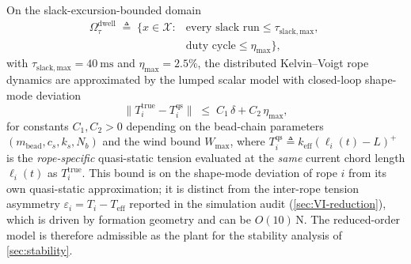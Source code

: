 \begin{theorem}
\label{thm:reduction}
On the slack-excursion-bounded domain
\begin{align}
\label{eq:omega-dwell}
  \Omega_\tau^{\mathrm{dwell}} \;\triangleq\;
    \bigl\{ x \in \mathcal{X} :
      &\text{every slack run} \le \tau_{\mathrm{slack,max}},\;\\
      &\text{duty cycle} \le \eta_{\max} \bigr\},\nonumber
\end{align}
with $\tau_{\mathrm{slack,max}} = \SI{40}{\milli\second}$ and $\eta_{\max} = 2.5\%$, the distributed Kelvin--Voigt rope dynamics are approximated by the lumped scalar model with closed-loop shape-mode deviation
\begin{equation}
  \|T_i^{\mathrm{true}} - T_i^{\mathrm{qs}}\|
    \;\le\; C_1\,\delta + C_2\,\eta_{\max},
  \label{eq:reduction-error}
\end{equation}
for constants $C_1, C_2 > 0$ depending on the bead-chain parameters $(m_{\mathrm{bead}}, c_s, k_s, N_b)$ and the wind bound $W_{\max}$, where $T_i^{\mathrm{qs}} \triangleq k_{\mathrm{eff}}(\ell_i(t) - L)^+$ is the\emph{ rope-specific} quasi-static tension evaluated at the \emph{same} current chord length $\ell_i(t)$ as $T_i^{\mathrm{true}}$.  This bound is on the shape-mode deviation of rope $i$ from its own quasi-static approximation; it is distinct from the inter-rope tension asymmetry $\varepsilon_i = T_i - T_{\mathrm{eff}}$ reported in the simulation audit (\cref{sec:VI-reduction}), which is driven by formation geometry and can be $O(10)$\,N. The reduced-order model is therefore admissible as the plant for the stability analysis of \cref{sec:stability}.
\end{theorem}

